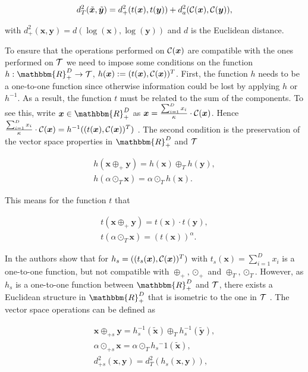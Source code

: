 \begin{gather}
d_T^2(\tilde{\bm{x}},\tilde{\bm{y}}) = d_+^2(t(\bm{x}),t(\bm{y})) + d_a^2(\mathcal{C}(\bm{x}),\mathcal{C}(\bm{y})),
\label{eq:distance Tspace}
\end{gather}

with $d_+^2(\bm{x},\bm{y}) = d(\log(\bm{x}),\log(\bm{y}))$ and $d$ is the Euclidean distance. 

To ensure that the operations performed on $\mathcal{C}(\bm{x})$ are compatible with the ones performed on $\mathcal{T}$ we need to impose some conditions on the function $h:\mathbbm{R}_+^D \rightarrow \Tsp$, $h(\bm{x}):=(t(\bm{x}),\mathcal{C}(\bm{x}))^T$. First, the function $h$ needs to be a one-to-one function since otherwise information could be lost by applying $h$ or $h^{-1}$. As a result, the function $t$ must be related to the sum of the components. To see this, write $\bm{x} \in \mathbbm{R}_+^D$ as $\bm{x} = \frac{\sum_{i=1}^D x_i}{\kappa} \cdot \mathcal{C}(\bm{x})$. Hence $ \frac{\sum_{i=1}^D x_i}{\kappa} \cdot \mathcal{C}(\bm{x}) = h^{-1}((t(\bm{x}),\mathcal{C}(\bm{x}))^T)$ \cite{Pawlowsky:2013}.
The second condition is the preservation of the vector space properties in $\mathbbm{R}_+^D$ and $\mathcal{T}$

\begin{gather}
h(\bm{x} \oplus_+ \bm{y}) = h(\bm{x}) \oplus_T h(\bm{y}), \\
h(\alpha \odot_T \bm{x}) = \alpha \odot_T h(\bm{x}). 
\label{eq:Vector Space Properties}
\end{gather}

This means for the function $t$ that 

\begin{gather}
t(\bm{x} \oplus_+ \bm{y}) = t(\bm{x}) \cdot t(\bm{y}), \\
t(\alpha \odot_T \bm{x}) = (t(\bm{x}))^{\alpha}. 
\label{eq:Vector Space Properties for t}
\end{gather}

In \cite{Pawlowsky:2013} the authors show that for $h_s=((t_s(\bm{x}),\mathcal{C}(\bm{x}))^T)$ with $t_s(\bm{x}) = \sum_{i=1}^D x_i$ is a one-to-one function, but not compatible with $\oplus_+,\odot_+$ and $\oplus_T,\odot_T$. However, as $h_s$ is a one-to-one function between $\mathbbm{R}_+^D$ and $\mathcal{T}$, there exists a Euclidean structure in $\mathbbm{R}_+^D$ that is isometric to the one in $\mathcal{T}$ \cite{Pawlowsky:2013}. The vector space operations can be defined as

\begin{gather}
\bm{x} \oplus_{+s} \bm{y} = h_s^{-1}(\tilde{\bm{x}}) \oplus_T  h_s^{-1}(\tilde{\bm{y}}), \\
\alpha \odot_{+s} \bm{x} = \alpha \odot_T h_s{^-1}(\tilde{\bm{x}}), \\
d_{+s}^2(\bm{x},\bm{y}) = d_T^2(h_s(\bm{x},\bm{y})),
\label{eq:Vector Space Operations sum}
\end{gather}

